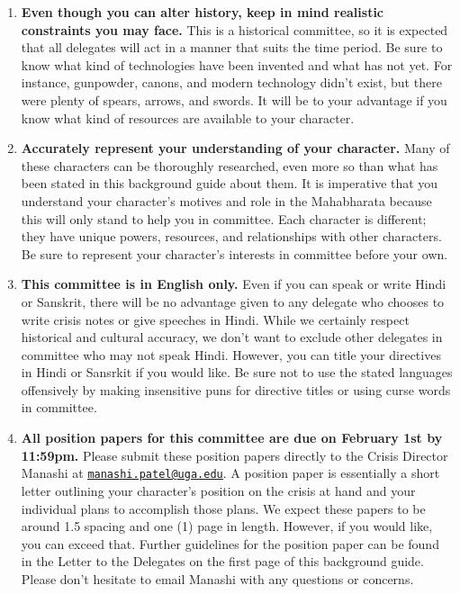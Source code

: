 \documentclass[10pt, letterpaper]{article}
\begin{document}
\begin{enumerate}
\item
  
  \textbf{Even though you can alter history, keep in mind realistic
  constraints you may face.} This is a historical committee, so it is
  expected that all delegates will act in a manner that suits the time
  period. Be sure to know what kind of technologies have been invented
  and what has not yet. For instance, gunpowder, canons, and modern
  technology didn't exist, but there were plenty of spears, arrows, and
  swords. It will be to your advantage if you know what kind of
  resources are available to your character.
  
\item
  
  \textbf{Accurately represent your understanding of your character.}
  Many of these characters can be thoroughly researched, even more so
  than what has been stated in this background guide about them. It is
  imperative that you understand your character's motives and role in
  the Mahabharata because this will only stand to help you in committee.
  Each character is different; they have unique powers, resources, and
  relationships with other characters. Be sure to represent your
  character's interests in committee before your own.
  
\item
  
  \textbf{This committee is in English only.} Even if you can speak or
  write Hindi or Sanskrit, there will be no advantage given to any
  delegate who chooses to write crisis notes or give speeches in Hindi.
  While we certainly respect historical and cultural accuracy, we don't
  want to exclude other delegates in committee who may not speak Hindi.
  However, you can title your directives in Hindi or Sansrkit if you
  would like. Be sure not to use the stated languages offensively by
  making insensitive puns for directive titles or using curse words in
  committee.
  
\item
  
  \textbf{All position papers for this committee are due on February 1st
  by 11:59pm.} Please submit these position papers directly to the
  Crisis Director Manashi at
  \texttt{\href{mailto:manashi.patel@uga.edu}{\underline{manashi.patel@uga.edu}}}.
  A position paper is essentially a short letter outlining your
  character's position on the crisis at hand and your individual plans
  to accomplish those plans. We expect these papers to be around 1.5
  spacing and one (1) page in length. However, if you would like, you
  can exceed that. Further guidelines for the position paper can be
  found in the Letter to the Delegates on the first page of this
  background guide. Please don't hesitate to email Manashi with any
  questions or concerns.
  
\end{enumerate}
\end{document}
